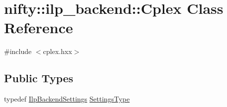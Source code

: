 \hypertarget{classnifty_1_1ilp__backend_1_1Cplex}{}\section{nifty\+:\+:ilp\+\_\+backend\+:\+:Cplex Class Reference}
\label{classnifty_1_1ilp__backend_1_1Cplex}


{\ttfamily \#include $<$cplex.\+hxx$>$}

\subsection*{Public Types}
\begin{DoxyCompactItemize}
\item 
typedef \hyperlink{structnifty_1_1ilp__backend_1_1IlpBackendSettings}{Ilp\+Backend\+Settings} \hyperlink{classnifty_1_1ilp__backend_1_1Cplex_a55f68efdbd0060526e09b037be4e6a49}{Settings\+Type}
\end{DoxyCompactItemize}

